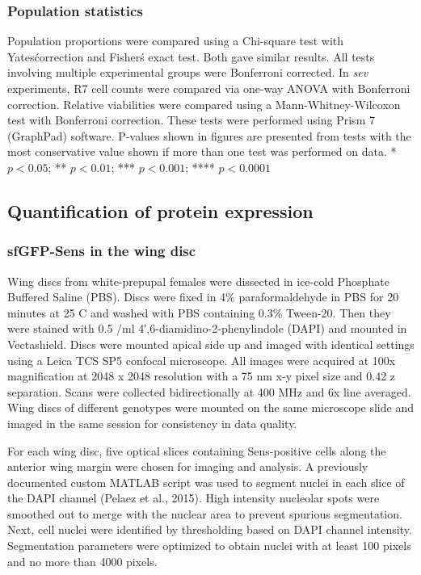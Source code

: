 \subsubsection{Population statistics}

Population proportions were compared using a Chi-square test with Yates\' correction and Fisher\'s exact test. Both gave similar results. All tests involving multiple experimental groups were Bonferroni corrected. In \textit{sev} experiments, R7 cell counts were compared via one-way ANOVA with Bonferroni correction. Relative viabilities were compared using a Mann-Whitney-Wilcoxon test with Bonferroni correction. These tests were performed using Prism 7 (GraphPad) software. P-values shown in figures are presented from tests with the most conservative value shown if more than one test was performed on data. * $p<0.05$; ** $p<0.01$; *** $p<0.001$; **** $p<0.0001$

\subsection{Quantification of protein expression}
\label{appendix:supp:metabolism:exp:measurements}

\subsubsection{sfGFP-Sens in the wing disc}
\label{appendix:supp:metabolism:exp:sens}

Wing discs from white-prepupal females were dissected in ice-cold Phosphate Buffered Saline (PBS). Discs were fixed in 4\% paraformaldehyde in PBS for 20 minutes at 25 \textdegree{}C and washed with PBS containing 0.3\% Tween-20. Then they were stained with 0.5 \mug/ml 4′,6-diamidino-2-phenylindole (DAPI) and mounted in Vectashield. Discs were mounted apical side up and imaged with identical settings using a Leica TCS SP5 confocal microscope. All images were acquired at 100x magnification at 2048 x 2048 resolution with a 75 nm x-y pixel size and 0.42 \mum z separation. Scans were collected bidirectionally at 400 MHz and 6x line averaged. Wing discs of different genotypes were mounted on the same microscope slide and imaged in the same session for consistency in data quality.

For each wing disc, five optical slices containing Sens-positive cells along the anterior wing margin were chosen for imaging and analysis. A previously documented custom MATLAB script was used to segment nuclei in each slice of the DAPI channel (Pelaez et al., 2015). High intensity nucleolar spots were smoothed out to merge with the nuclear area to prevent spurious segmentation. Next, cell nuclei were identified by thresholding based on DAPI channel intensity. Segmentation parameters were optimized to obtain nuclei with at least 100 pixels and no more than 4000 pixels.

